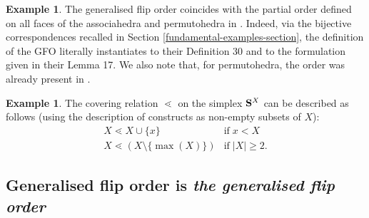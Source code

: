 \documentclass{article}
\theoremstyle{plain}
\theoremstyle{definition}
\newtheorem{example}[thm]{\sc Example}
\newcommand{\set}[1]{\{#1\}}
\newcommand{\hyper}[1]{{\bf #1}}
\begin{document}
\begin{example} \label{extends-PR-K}
 The generalised flip order coincides with the partial order defined on all faces of the associahedra and permutohedra in \cite{PalaciosRonco}. Indeed, via the bijective correspondences recalled in Section \ref{fundamental-examples-section}, the definition of the GFO literally instantiates to their Definition 30 and to the formulation given in their Lemma 17. We also note that, for permutohedra, the order was already present in \cite{KLNPS}. 
\end{example}
 
 
\begin{example} 
The covering relation $\lessdot$ on the simplex $\hyper{S}^X$ can be described as follows (using the description of constructs as non-empty subsets of $X$):
$$\begin{array}{ll}
X\lessdot X\cup\set{x} & \mbox{if}\; x<X\\
X \lessdot (X\setminus\set{\max(X)}) & \mbox{if}\;|X|\geq 2.
\end{array}$$
 \end{example}


 

 
 \subsection{Generalised flip order is {\em the generalised flip order}} \label{2.2}
 
 
\end{document}
